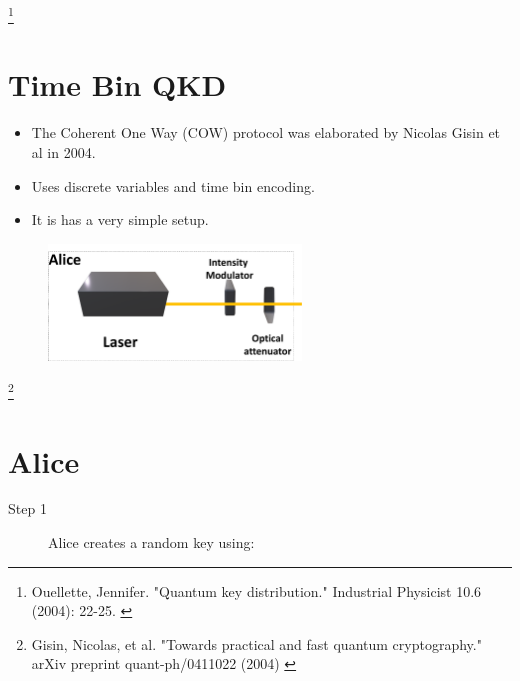 \documentclass[1000pt]{article}
\newcommand{\mysection}[1]{\section*{\color{black}\sffamily #1}}%
\newcommand{\cref}[1]{{\fontsize{17pt}{0cm}\selectfont\color{black} #1}}%
\newcommand\blfootnote[1]{%
  \begingroup
  \renewcommand\thefootnote{}\footnote{#1}%
  \addtocounter{footnote}{-1}%
  \endgroup
}
\begin{document}
\blfootnote{
\hspace*{12cm}
\begin{minipage}{26cm}
\cref{
Ouellette, Jennifer. "Quantum key distribution." Industrial Physicist 10.6 (2004): 22-25.
}
\end{minipage}

}
\mysection{\Huge\textbf{Time Bin QKD}} \Large \vspace*{1cm}
\begin{itemize}

\item The Coherent One Way (COW) protocol was elaborated by Nicolas Gisin et al in 2004. 

\item Uses discrete variables and time bin encoding.

\item It is has a very simple setup.
\end{itemize}
    \begin{figure}[hbt]
    	\centering
    	\includegraphics[width=0.6\textwidth]{./figures/A.pdf}
        	\label{bob}
    \end{figure}
    
\blfootnote{
\hspace*{12cm}
\begin{minipage}{26cm}
\cref{
Gisin, Nicolas, et al. "Towards practical and fast quantum cryptography." arXiv preprint quant-ph/0411022 (2004)
}
\end{minipage}
}

\mysection{\Huge\textbf{Alice}} \Large \vspace*{1cm}

\begin{description}

\item[Step 1] Alice creates a random key using: 
 
\end{description}
\end{document}

